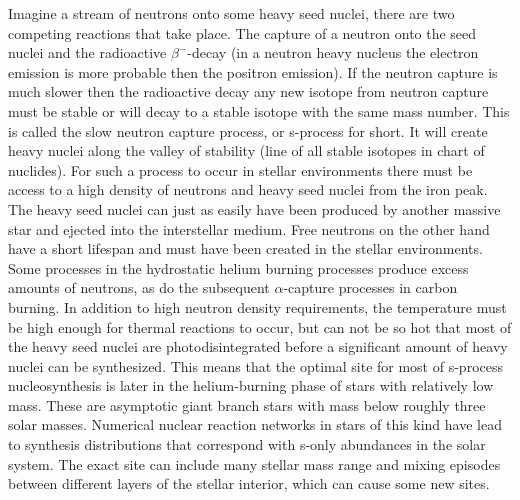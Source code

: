 Imagine a stream of neutrons onto some heavy seed nuclei, there are two competing reactions that take place. The capture of a neutron onto the seed nuclei and the radioactive $\beta^-$-decay (in a neutron heavy nucleus the electron emission is more probable then the positron emission).
If the neutron capture is much slower then the radioactive decay any new
isotope from neutron capture must be stable or will decay to a stable isotope
with the same mass number. This is called the slow neutron capture process, or s-process for short.
It will create heavy nuclei along the valley of stability (line of all stable isotopes in chart of nuclides).
For such a process to occur in stellar environments there must be access to a high density of neutrons and heavy seed nuclei from the iron peak.
The heavy seed nuclei can just as easily have been produced by another massive star and ejected into the interstellar medium. Free neutrons on the other hand have a short lifespan and must have been created in the stellar environments.
Some processes in the hydrostatic helium burning processes produce excess amounts of neutrons, as do the subsequent $\alpha$-capture processes in carbon burning.
In addition to high neutron density requirements, the temperature must be high enough for thermal reactions to occur, but can not be so hot that most of the heavy seed nuclei are photodisintegrated before a significant amount of heavy nuclei can be synthesized.
This means that the optimal site for most of s-process nucleosynthesis is later in the helium-burning phase of stars with relatively low mass. These are asymptotic giant branch stars with mass below roughly three solar masses.
Numerical nuclear reaction networks in stars of this kind have lead to synthesis distributions that correspond with s-only abundances in the solar system.
The exact site can include many stellar mass range and mixing episodes between different layers of the stellar interior, which can cause some new sites.

